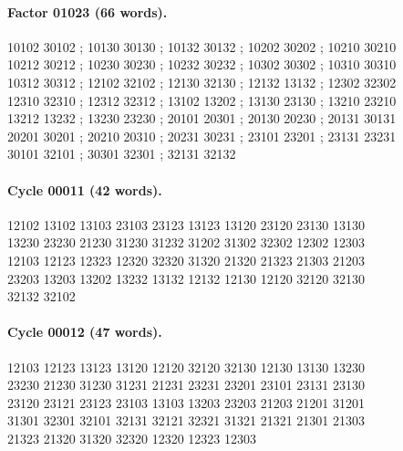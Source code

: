\documentclass[11pt]{article}
\theoremstyle{remark}
\numberwithin{equation}{section}
\begin{document}
\paragraph{Factor 01023 (66 words).}
\begingroup\small\ttfamily\begin{flushleft}
10102 30102 ; 10130 30130 ; 10132 30132 ; 10202 30202 ; 10210 30210\\
10212 30212 ; 10230 30230 ; 10232 30232 ; 10302 30302 ; 10310 30310\\
10312 30312 ; 12102 32102 ; 12130 32130 ; 12132 13132 ; 12302 32302\\
12310 32310 ; 12312 32312 ; 13102 13202 ; 13130 23130 ; 13210 23210\\
13212 13232 ; 13230 23230 ; 20101 20301 ; 20130 20230 ; 20131 30131\\
20201 30201 ; 20210 20310 ; 20231 30231 ; 23101 23201 ; 23131 23231\\
30101 32101 ; 30301 32301 ; 32131 32132\\
\end{flushleft}\endgroup
\paragraph{Cycle 00011 (42 words).}
\begingroup\small\ttfamily\begin{flushleft}
12102 13102 13103 23103 23123 13123 13120 23120 23130 13130\\
13230 23230 21230 31230 31232 31202 31302 32302 12302 12303\\
12103 12123 12323 12320 32320 31320 21320 21323 21303 21203\\
23203 13203 13202 13232 13132 12132 12130 12120 32120 32130\\
32132 32102\\
\end{flushleft}\endgroup
\paragraph{Cycle 00012 (47 words).}
\begingroup\small\ttfamily\begin{flushleft}
12103 12123 13123 13120 12120 32120 32130 12130 13130 13230\\
23230 21230 31230 31231 21231 23231 23201 23101 23131 23130\\
23120 23121 23123 23103 13103 13203 23203 21203 21201 31201\\
31301 32301 32101 32131 32121 32321 31321 21321 21301 21303\\
21323 21320 31320 32320 12320 12323 12303\\
\end{flushleft}\endgroup
\end{document}
